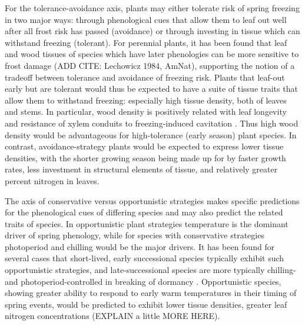 \documentclass[11pt]{article}
\begin{document}
For the tolerance-avoidance axis, plants may either tolerate risk of spring freezing in two major ways: through phenological cues that allow them to leaf out well after all frost risk has passed (avoidance) or through investing in tissue which can withstand freezing (tolerant). For perennial plants, it has been found that leaf and wood tissues of species which have later phenologies can be more sensitive to frost damage \cite{CaraDonna:2014aa,Vitasse:2014aa} (ADD CITE: Lechowicz 1984, AmNat), supporting the notion of a tradeoff between tolerance and avoidance of freezing risk. Plants that leaf-out early but are tolerant would thus be expected to have a suite of tissue traits that allow them to withstand freezing: especially high tissue density, both of leaves and stems. In particular, wood density is positively related with leaf longevity and resistance of xylem conduits to freezing-induced cavitation \cite{Chave:2009aa}. Thus high wood density would be advantageous for high-tolerance (early season) plant species. In contrast, avoidance-strategy plants would be expected to express lower tissue densities, with the shorter growing season being made up for by faster growth rates, less investment in structural elements of tissue, and relatively greater percent nitrogen in leaves. 

The axis of conservative versus opportunistic strategies makes specific predictions for the phenological cues of differing species and may also predict the related traits of species. In opportunistic plant strategies temperature is the dominant driver of spring phenology, while for species with conservative strategies photoperiod and chilling would be the major drivers. It has been found for several cases that short-lived, early successional species typically exhibit such opportunistic strategies, and late-successional species are more typically chilling- and photoperiod-controlled in breaking of dormancy \cite{Korner:2010}\cite{Basler:2012aa}\cite{Caffarra:2011ab}. Opportunistic species, showing greater ability to respond to early warm temperatures in their timing of spring events, would be predicted to exhibit lower tissue densities, greater leaf nitrogen concentrations (EXPLAIN a little MORE HERE). 
\end{document}
